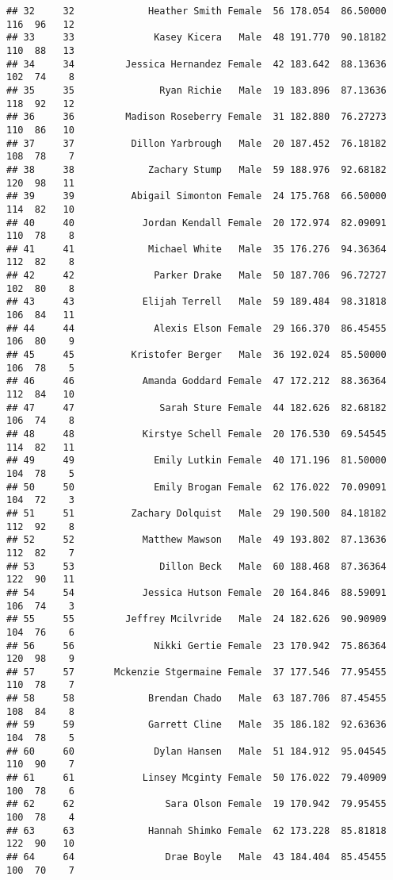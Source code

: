 \documentclass[
]{article}
\begin{document}
\begin{verbatim}
## 32     32             Heather Smith Female  56 178.054  86.50000 116  96   12
## 33     33              Kasey Kicera   Male  48 191.770  90.18182 110  88   13
## 34     34         Jessica Hernandez Female  42 183.642  88.13636 102  74    8
## 35     35               Ryan Richie   Male  19 183.896  87.13636 118  92   12
## 36     36         Madison Roseberry Female  31 182.880  76.27273 110  86   10
## 37     37          Dillon Yarbrough   Male  20 187.452  76.18182 108  78    7
## 38     38             Zachary Stump   Male  59 188.976  92.68182 120  98   11
## 39     39          Abigail Simonton Female  24 175.768  66.50000 114  82   10
## 40     40            Jordan Kendall Female  20 172.974  82.09091 110  78    8
## 41     41             Michael White   Male  35 176.276  94.36364 112  82    8
## 42     42              Parker Drake   Male  50 187.706  96.72727 102  80    8
## 43     43            Elijah Terrell   Male  59 189.484  98.31818 106  84   11
## 44     44              Alexis Elson Female  29 166.370  86.45455 106  80    9
## 45     45          Kristofer Berger   Male  36 192.024  85.50000 106  78    5
## 46     46            Amanda Goddard Female  47 172.212  88.36364 112  84   10
## 47     47               Sarah Sture Female  44 182.626  82.68182 106  74    8
## 48     48            Kirstye Schell Female  20 176.530  69.54545 114  82   11
## 49     49              Emily Lutkin Female  40 171.196  81.50000 104  78    5
## 50     50              Emily Brogan Female  62 176.022  70.09091 104  72    3
## 51     51          Zachary Dolquist   Male  29 190.500  84.18182 112  92    8
## 52     52            Matthew Mawson   Male  49 193.802  87.13636 112  82    7
## 53     53               Dillon Beck   Male  60 188.468  87.36364 122  90   11
## 54     54            Jessica Hutson Female  20 164.846  88.59091 106  74    3
## 55     55         Jeffrey Mcilvride   Male  24 182.626  90.90909 104  76    6
## 56     56              Nikki Gertie Female  23 170.942  75.86364 120  98    9
## 57     57       Mckenzie Stgermaine Female  37 177.546  77.95455 110  78    7
## 58     58             Brendan Chado   Male  63 187.706  87.45455 108  84    8
## 59     59             Garrett Cline   Male  35 186.182  92.63636 104  78    5
## 60     60              Dylan Hansen   Male  51 184.912  95.04545 110  90    7
## 61     61            Linsey Mcginty Female  50 176.022  79.40909 100  78    6
## 62     62                Sara Olson Female  19 170.942  79.95455 100  78    4
## 63     63             Hannah Shimko Female  62 173.228  85.81818 122  90   10
## 64     64                Drae Boyle   Male  43 184.404  85.45455 100  70    7

\end{verbatim}
\end{document}

